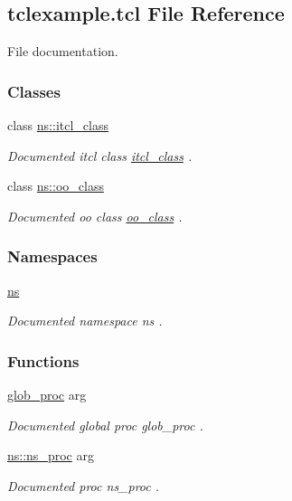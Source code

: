 \hypertarget{tclexample_8tcl}{}\subsection{tclexample.\+tcl File Reference}
\label{tclexample_8tcl}


File documentation.  


\subsubsection*{Classes}
\begin{DoxyCompactItemize}
\item 
class \hyperlink{classns_1_1itcl__class}{ns\+::itcl\+\_\+class}
\begin{DoxyCompactList}\small\item\em Documented itcl class {\ttfamily \hyperlink{classns_1_1itcl__class}{itcl\+\_\+class}} . \end{DoxyCompactList}\item 
class \hyperlink{classns_1_1oo__class}{ns\+::oo\+\_\+class}
\begin{DoxyCompactList}\small\item\em Documented oo class {\ttfamily \hyperlink{classns_1_1oo__class}{oo\+\_\+class}} . \end{DoxyCompactList}\end{DoxyCompactItemize}
\subsubsection*{Namespaces}
\begin{DoxyCompactItemize}
\item 
 \hyperlink{namespacens}{ns}
\begin{DoxyCompactList}\small\item\em Documented namespace {\ttfamily ns} . \end{DoxyCompactList}\end{DoxyCompactItemize}
\subsubsection*{Functions}
\begin{DoxyCompactItemize}
\item 
\hyperlink{tclexample_8tcl_a6fd2deb737d7421831004f9302f451ee}{glob\+\_\+proc} arg
\begin{DoxyCompactList}\small\item\em Documented global proc {\ttfamily glob\+\_\+proc} . \end{DoxyCompactList}\item 
\hyperlink{namespacens_a1429cbe84d32b17ea4783e5c5c00615b}{ns\+::ns\+\_\+proc} arg
\begin{DoxyCompactList}\small\item\em Documented proc {\ttfamily ns\+\_\+proc} . \end{DoxyCompactList}\end{DoxyCompactItemize}


